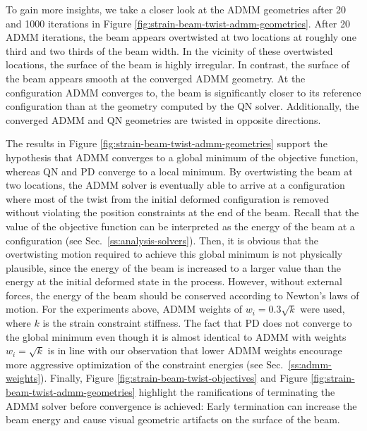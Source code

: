 To gain more insights, we take a closer look at the ADMM geometries after 20 and 1000 iterations in Figure \ref{fig:strain-beam-twist-admm-geometries}. After 20 ADMM iterations, 
the beam appears overtwisted at two locations at roughly one third and two thirds of the beam width. In the vicinity of these overtwisted locations, the surface of the 
beam is highly irregular. In contrast, the surface of the beam appears smooth at the converged ADMM geometry. At the configuration ADMM converges to, the beam is 
significantly closer to its reference configuration than at the geometry computed by the QN solver. Additionally, the converged ADMM and QN geometries are twisted in 
opposite directions.

The results in Figure \ref{fig:strain-beam-twist-admm-geometries} support the hypothesis that ADMM converges to a global minimum of the objective function, whereas QN and PD 
converge to a local minimum. By overtwisting the beam at two locations, the ADMM solver is eventually able to arrive at a configuration where most of the twist from the 
initial deformed configuration is removed without violating the position constraints at the end of the beam. Recall that the value of the objective function can be 
interpreted as the energy of the beam at a configuration (see Sec.\ \ref{ss:analysis-solvers}). Then, it is obvious that the overtwisting motion required to achieve this 
global minimum is not physically plausible, since the energy of the beam is increased to a larger value than the energy at the initial deformed state in the process.
However, without external forces, the energy of the beam should be conserved according to Newton's laws of motion. For the experiments above, ADMM weights of 
$w_i = 0.3\sqrt{k}$ were used, where $k$ is the strain constraint stiffness. The fact that PD does not converge to the global minimum even though it is almost 
identical to ADMM with weights $w_i = \sqrt{k}$ is in line with our observation that lower ADMM weights encourage more aggressive optimization of the constraint 
energies (see Sec.\ \ref{ss:admm-weights}). Finally, Figure \ref{fig:strain-beam-twist-objectives} and Figure \ref{fig:strain-beam-twist-admm-geometries} highlight the ramifications
of terminating the ADMM solver before convergence is achieved: Early termination can increase the beam energy and cause visual geometric artifacts on the surface of the beam.

